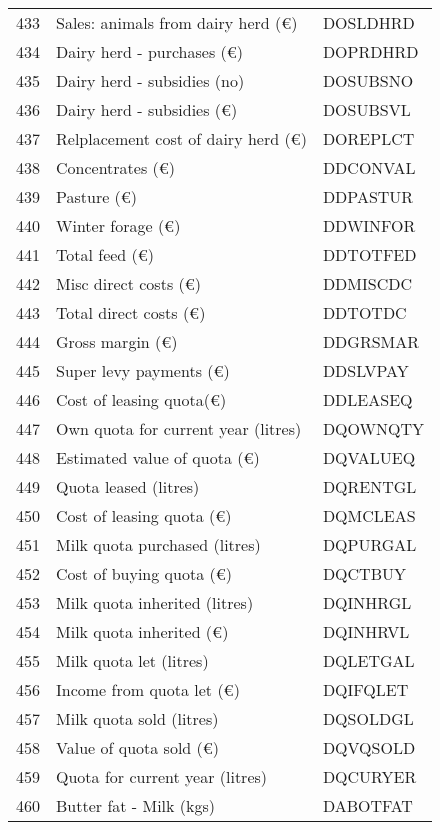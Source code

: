 \documentclass{article}\usepackage{graphicx, color}
\begin{document}
\begin{flushleft}
\begin{table}[ht]
\begin{center}
\begin{tabular}{rll}
  433 & Sales: animals from dairy herd   (€) & DOSLDHRD \\ 
  434 & Dairy herd - purchases           (€) & DOPRDHRD \\ 
  435 & Dairy herd - subsidies     (no) & DOSUBSNO \\ 
  436 & Dairy herd - subsidies     (€) & DOSUBSVL \\ 
  437 & Relplacement cost of dairy herd  (€) & DOREPLCT \\ 
  438 & Concentrates         (€) & DDCONVAL \\ 
  439 & Pasture              (€) & DDPASTUR \\ 
  440 & Winter forage        (€) & DDWINFOR \\ 
  441 & Total feed           (€) & DDTOTFED \\ 
  442 & Misc direct costs    (€) & DDMISCDC \\ 
  443 & Total direct costs   (€) & DDTOTDC \\ 
  444 & Gross margin         (€) & DDGRSMAR \\ 
  445 & Super levy payments  (€) & DDSLVPAY \\ 
  446 & Cost of leasing quota(€) & DDLEASEQ \\ 
  447 & Own quota for current year (litres) & DQOWNQTY \\ 
  448 & Estimated value of quota   (€) & DQVALUEQ \\ 
  449 & Quota leased               (litres) & DQRENTGL \\ 
  450 & Cost of leasing quota      (€) & DQMCLEAS \\ 
  451 & Milk quota purchased       (litres) & DQPURGAL \\ 
  452 & Cost of buying quota       (€) & DQCTBUY \\ 
  453 & Milk quota inherited       (litres) & DQINHRGL \\ 
  454 & Milk quota inherited       (€) & DQINHRVL \\ 
  455 & Milk quota let             (litres) & DQLETGAL \\ 
  456 & Income from quota let      (€) & DQIFQLET \\ 
  457 & Milk quota sold            (litres) & DQSOLDGL \\ 
  458 & Value of quota sold        (€) & DQVQSOLD \\ 
  459 & Quota for current year     (litres) & DQCURYER \\ 
  460 & Butter fat - Milk          (kgs) & DABOTFAT \\ 

\end{tabular}
\end{center}
\end{table}
\end{flushleft}
\end{document}
